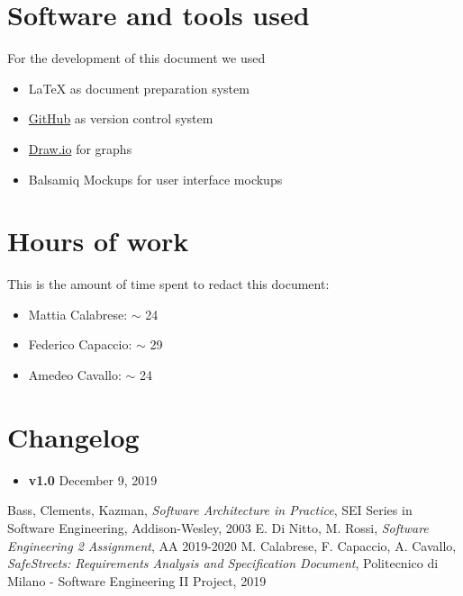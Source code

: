 \setlength{\parindent}{4ex}
\setlength{\parskip}{1ex}

\begin{appendices}

	\section{Software and tools used}
	For the development of this document we used
	\begin{itemize}
		\item \LaTeX{} as document preparation system
		\item \href{http://github.com}{GitHub} as version control system
		\item \href{http://draw.io}{Draw.io} for graphs 
		\item Balsamiq Mockups for user interface mockups
	\end{itemize}
	
	\section{Hours of work}
	This is the amount of time spent to redact this document:
	\begin{itemize}
		\item Mattia Calabrese: $\sim$ 24
		\item Federico Capaccio: $\sim$ 29
		\item Amedeo Cavallo: $\sim$ 24
	\end{itemize}
	
		\section{Changelog}
	\begin{itemize}
		\item \textbf{v1.0} December 9, 2019
	\end{itemize}
	
\end{appendices}


\begin{thebibliography}{9}

Bass, Clements, Kazman, \emph{Software Architecture in Practice}, SEI Series in Software Engineering, Addison-­Wesley, 2003
 E. Di Nitto, M. Rossi, \emph{Software Engineering 2 Assignment}, AA 2019-2020
 M. Calabrese, F. Capaccio, A. Cavallo, \emph{SafeStreets: Requirements Analysis and Specification Document}, Politecnico di Milano - Software Engineering II Project, 2019

\end{thebibliography}